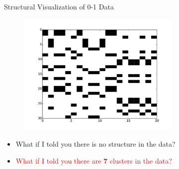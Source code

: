 \documentclass[first=dgreen,second=purple,logo=redexc]{aaltoslides}
\begin{document}
\begin{frame} {Structural Visualization of 0-1 Data} 

      \begin{figure}
      \centering
      \includegraphics[trim=1cm 0.5cm 1cm 1cm, clip=true, width=0.7\textwidth]{figures/scrambled}
      \end{figure}
      
      \begin{itemize}\setlength{\itemsep}{1mm}
      \item What if I told you there is no structure in the data? 
      \pause \item \textcolor {red}{What if I told you there are \textbf{7} clusters in the data?} 
      \end{itemize}
       
     
\end{frame}

\end{document}
